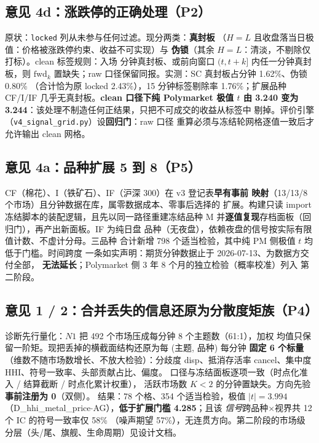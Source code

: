 \documentclass[11pt, a4paper]{ctexart}
\newcommand{\code}[1]{\texttt{\small #1}}
\begin{document}
\subsection{意见 4d：涨跌停的正确处理（P2）}

原状：\code{locked} 列从未参与任何过滤。现分两类：\textbf{真封板}
（$H=L$ 且收盘落当日极值：价格被涨跌停约束、收益不可实现）与
\textbf{伪锁}（其余 $H=L$：清淡，不剔除仅打标）。clean 标签规则：入场
分钟真封板、或前向窗口 $(t,t+k]$ 内任一分钟真封板，则 $\mathrm{fwd}_k$
置缺失；raw 口径保留同报。实测：SC 真封板占分钟 1.62\%、伪锁 0.80\%
（合计恰为原 locked 2.43\%），15 分钟标签剔除率 1.76\%；扩展品种
CF/I/IF 几乎无真封板。\textbf{clean 口径下纯 Polymarket 极值 $t$ 由
3.240 变为 3.244}：该处理不制造任何正结果，只把不可成交的收益从标签中
剔掉。评价引擎（\code{v4\_signal\_grid.py}）设\textbf{回归门}：raw 口径
重算必须与冻结轮网格逐值一致后才允许输出 clean 网格。

\subsection{意见 4a：品种扩展 5 到 8（P5）}

CF（棉花）、I（铁矿石）、IF（沪深 300）在 v3 登记表\textbf{早有事前
映射}（13/13/8 个市场）且分钟数据在库，属零数据成本、零事后选择的
扩展。构建只读 import 冻结脚本的装配逻辑，且先以同一路径重建冻结品种
M 并\textbf{逐值复现}存档面板（回归门），再产出新面板。IF 为纯日盘
品种（无夜盘），依赖夜盘的信号按实际有限值计数、不虚计分母。三品种
合计新增 798 个适当检验，其中纯 PM 侧极值 $t$ 均低于门槛。时间跨度
一条如实声明：期货分钟数据止于 2026-07-13、为数据方交付全部，
\textbf{无法延长}；Polymarket 侧 3 年 8 个月的独立检验（概率校准）列入
第二阶段。

\subsection{意见 1 / 2：合并丢失的信息还原为分散度矩族（P4）}

诊断先行量化：$N1$ 把 492 个市场压成每分钟 8 个主题数（61:1），加权
均值只保留一阶矩。现把丢掉的横截面结构还原为每 (主题, 品种) 每分钟
\textbf{固定 6 个标量}（维数不随市场数增长、不放大检验）：分歧度
disp、抵消存活率 cancel、集中度 HHI、符号一致率、头部贡献占比、偏度。
口径与冻结面板逐项一致（时点化准入 / 结算截断 / 时点化累计权重），
活跃市场数 $K<2$ 的分钟置缺失。方向先验\textbf{事前注册为 0}（双侧）。
结果：78 个格、354 个适当检验，极值 $|t|=3.994$
（D\_hhi\_metal\_price$\cdot$AG），\textbf{低于扩展门槛 4.285}；且该
\emph{信号}跨品种$\times$视界共 12 个 IC 的符号一致率仅 58\%
（噪声期望 57\%），无连贯方向。第二阶段的市场级
分层（头/尾、旗舰、生命周期）见设计文档。
\end{document}
